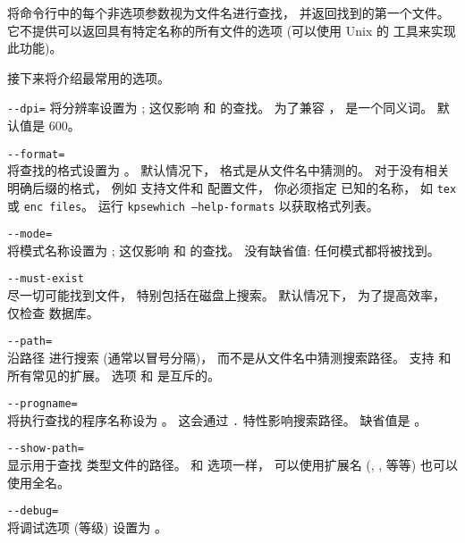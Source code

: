 \documentclass{article}
\begin{document}
\KPS{} 将命令行中的每个非选项参数视为文件名进行查找，
并返回找到的第一个文件。
它不提供可以返回具有特定名称的所有文件的选项
(可以使用 Unix 的  工具来实现此功能)。

接下来将介绍最常用的选项。

\begin{ttdescription}
\item[\texttt{-{}-dpi=\var{num}}]\mbox{}
  将分辨率设置为 ; 
  这仅影响  和  的查找。
  为了兼容 ，
   是一个同义词。
  默认值是 600。

\item[\texttt{-{}-format=\var{name}}]\mbox{}\\
  将查找的格式设置为 。
  默认情况下，
  格式是从文件名中猜测的。
  对于没有相关明确后缀的格式，
  例如 \MP{} 支持文件和  配置文件，
  你必须指定 \KPS{} 已知的名称，
  如 \texttt{tex} 或 \texttt{enc files}。
  运行 \texttt{kpsewhich --help-formats} 以获取格式列表。

\item[\texttt{-{}-mode=\var{string}}]\mbox{}\\
  将模式名称设置为 ; 
  这仅影响  和  的查找。
  没有缺省值: 
  任何模式都将被找到。

\item[\texttt{-{}-must-exist}]\mbox{}\\
  尽一切可能找到文件，
  特别包括在磁盘上搜索。
  默认情况下，
  为了提高效率，
  仅检查  数据库。

\item[\texttt{-{}-path=\var{string}}]\mbox{}\\
  沿路径  进行搜索
  (通常以冒号分隔)，
  而不是从文件名中猜测搜索路径。
  支持 \samp{//} 和所有常见的扩展。
  选项  和  是互斥的。

\item[\texttt{-{}-progname=\var{name}}]\mbox{}\\
  将执行查找的程序名称设为 \texttt{}。
  这会通过 \texttt{.} 特性影响搜索路径。
  缺省值是 。

\item[\texttt{-{}-show-path=\var{name}}]\mbox{}\\
  显示用于查找 \texttt{} 类型文件的路径。
  和  选项一样，
  可以使用扩展名 (, , 等等) 也可以使用全名。

\item[\texttt{-{}-debug=\var{num}}]\mbox{}\\
  将调试选项 (等级) 设置为 \texttt{}。
\end{ttdescription}
\end{document}
